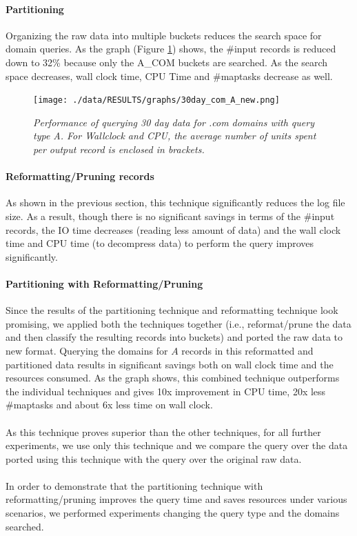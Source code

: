 \documentclass[11pt,a4paper]{article}
\begin{document}
\paragraph{Partitioning} Organizing the raw data into multiple buckets reduces the search space for domain queries. As the graph (Figure \ref{comafigure}) shows, the \#input records is reduced down to 32\% because only the A\_COM buckets are searched. As the search space decreases, wall clock time, CPU Time and \#maptasks decrease as well.

\begin{figure}[H] 
\centering
\texttt{[image: ./data/RESULTS/graphs/30day\_com\_A\_new.png]}
\caption {\textit{Performance of querying 30 day data for .com domains with query type A. For Wallclock and CPU, the average number of units spent per output record is enclosed in brackets.}}
\label{comafigure}
\end{figure}

\paragraph{Reformatting/Pruning records} As shown in the previous section, this technique significantly reduces the log file size. As a result, though there is no significant savings in terms of the \#input records, the IO time decreases (reading less amount of data) and the wall clock time and CPU time (to decompress data) to perform the query improves significantly.

\paragraph{Partitioning with Reformatting/Pruning} Since the results of the partitioning technique and reformatting technique look promising, we applied both the techniques together (i.e., reformat/prune the data and then classify the resulting records into buckets) and ported the raw data to new format. Querying the domains for $A$ records in this reformatted and partitioned data results in significant savings both on wall clock time and the resources consumed. As the graph shows, this combined technique outperforms the individual techniques and gives 10x improvement in CPU time, 20x less \#maptasks and about 6x less time on wall clock.
\\\\
As this technique proves superior than the other techniques, for all further experiments, we use only this technique and we compare the query over the data ported using this technique with the query over the original raw data.
\\\\
In order to demonstrate that the partitioning technique with reformatting/pruning improves the query time and saves resources under various scenarios, we performed experiments changing the query type and the domains searched.
\end{document}
